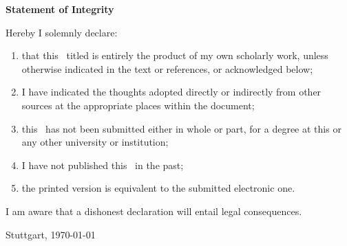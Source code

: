 \clearpage
\thispagestyle{empty}

{\LARGE\textsf{\textbf{Statement of Integrity}}}


Hereby I solemnly declare:
\begin{enumerate}
    \item that this \typMeinerArbeit\, titled \emph{\themaMeinerArbeit} is entirely the product of my own scholarly work, unless otherwise
    indicated in the text or references, or acknowledged below;

    \item I have indicated the thoughts adopted directly or indirectly from other sources at
    the appropriate places within the document;

    \item this \typMeinerArbeit\ has not been submitted either in whole or
    part, for a degree at this or any other university or institution;

    \item  I have not published this \typMeinerArbeit\ in the past;

    \item the printed version is equivalent to the submitted electronic one.
\end{enumerate}
I am aware that a dishonest declaration will entail legal consequences.


\vspace{2cm}

Stuttgart, \today

